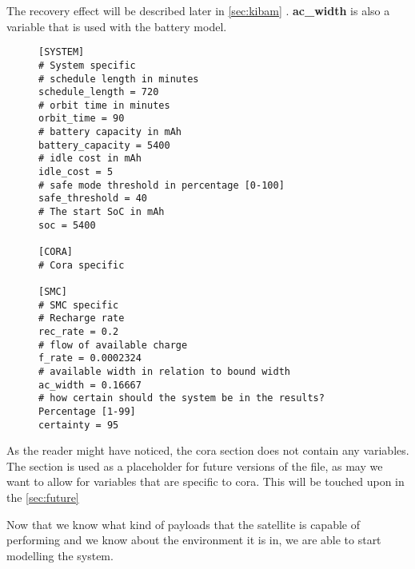 The recovery effect will be described later in \cref{sec:kibam} .
\textbf{ac\_width} is also a variable that is used with the battery model.
\begin{figure}[H]
\begin{lstlisting}[caption={An example of how the environment can be defined}, label=lst:ini, language=text]
[SYSTEM]
# System specific
# schedule length in minutes
schedule_length = 720
# orbit time in minutes
orbit_time = 90
# battery capacity in mAh
battery_capacity = 5400
# idle cost in mAh
idle_cost = 5
# safe mode threshold in percentage [0-100]
safe_threshold = 40
# The start SoC in mAh
soc = 5400

[CORA]
# Cora specific

[SMC]
# SMC specific
# Recharge rate
rec_rate = 0.2
# flow of available charge
f_rate = 0.0002324
# available width in relation to bound width
ac_width = 0.16667
# how certain should the system be in the results? Percentage [1-99]
certainty = 95
\end{lstlisting}
\end{figure}
As the reader might have noticed, the \gls{cora} section does not contain any variables.
The section is used as a placeholder for future versions of the file, as may we want to allow for variables that are specific to \gls{cora}.
This will be touched upon in the \cref{sec:future} 


Now that we know what kind of payloads that the satellite is capable of performing and we know about the environment it is in, we are able to start modelling the system.
